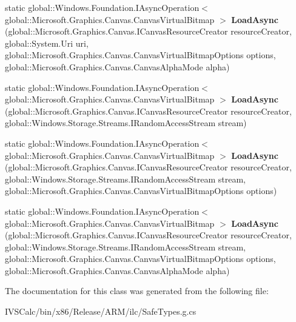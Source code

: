 \begin{DoxyCompactItemize}
static global\+::\+Windows.\+Foundation.\+I\+Async\+Operation$<$ global\+::\+Microsoft.\+Graphics.\+Canvas.\+Canvas\+Virtual\+Bitmap $>$ {\bfseries Load\+Async} (global\+::\+Microsoft.\+Graphics.\+Canvas.\+I\+Canvas\+Resource\+Creator resource\+Creator, global\+::\+System.\+Uri uri, global\+::\+Microsoft.\+Graphics.\+Canvas.\+Canvas\+Virtual\+Bitmap\+Options options, global\+::\+Microsoft.\+Graphics.\+Canvas.\+Canvas\+Alpha\+Mode alpha)
\item 
\mbox{\label{class_microsoft_1_1_graphics_1_1_canvas_1_1_canvas_virtual_bitmap_a56e5e79a80dccfdc011f98e647de9bcf}} 
static global\+::\+Windows.\+Foundation.\+I\+Async\+Operation$<$ global\+::\+Microsoft.\+Graphics.\+Canvas.\+Canvas\+Virtual\+Bitmap $>$ {\bfseries Load\+Async} (global\+::\+Microsoft.\+Graphics.\+Canvas.\+I\+Canvas\+Resource\+Creator resource\+Creator, global\+::\+Windows.\+Storage.\+Streams.\+I\+Random\+Access\+Stream stream)
\item 
\mbox{\label{class_microsoft_1_1_graphics_1_1_canvas_1_1_canvas_virtual_bitmap_a8cdd19fd36f49f203d6c0998ace732d1}} 
static global\+::\+Windows.\+Foundation.\+I\+Async\+Operation$<$ global\+::\+Microsoft.\+Graphics.\+Canvas.\+Canvas\+Virtual\+Bitmap $>$ {\bfseries Load\+Async} (global\+::\+Microsoft.\+Graphics.\+Canvas.\+I\+Canvas\+Resource\+Creator resource\+Creator, global\+::\+Windows.\+Storage.\+Streams.\+I\+Random\+Access\+Stream stream, global\+::\+Microsoft.\+Graphics.\+Canvas.\+Canvas\+Virtual\+Bitmap\+Options options)
\item 
\mbox{\label{class_microsoft_1_1_graphics_1_1_canvas_1_1_canvas_virtual_bitmap_abba7eac1de7fc7da41f8546a18aef233}} 
static global\+::\+Windows.\+Foundation.\+I\+Async\+Operation$<$ global\+::\+Microsoft.\+Graphics.\+Canvas.\+Canvas\+Virtual\+Bitmap $>$ {\bfseries Load\+Async} (global\+::\+Microsoft.\+Graphics.\+Canvas.\+I\+Canvas\+Resource\+Creator resource\+Creator, global\+::\+Windows.\+Storage.\+Streams.\+I\+Random\+Access\+Stream stream, global\+::\+Microsoft.\+Graphics.\+Canvas.\+Canvas\+Virtual\+Bitmap\+Options options, global\+::\+Microsoft.\+Graphics.\+Canvas.\+Canvas\+Alpha\+Mode alpha)
\end{DoxyCompactItemize}


The documentation for this class was generated from the following file\+:\begin{DoxyCompactItemize}
\item 
I\+V\+S\+Calc/bin/x86/\+Release/\+A\+R\+M/ilc/Safe\+Types.\+g.\+cs\end{DoxyCompactItemize}
